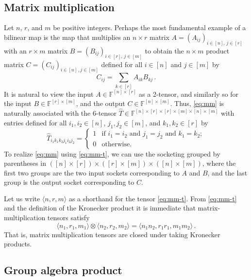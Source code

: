 \documentclass[11pt]{article}
\numberwithin{equation}{section}
\theoremstyle{definition}
\theoremstyle{plain}
\newcommand{\bra}{\ensuremath{\langle}}
\newcommand{\ket}{\ensuremath{\rangle}}
\newcommand{\F}{\ensuremath{\mathbb{F}}}
\begin{document}
\subsection{Matrix multiplication}
\label{sect:mm}

Let $n$, $r$, and $m$ be positive integers.
Perhaps the most fundamental example of a bilinear map is the map
that multiplies
an $n\times r$ matrix $A=(A_{ij})_{i\in[n],\,j\in [r]}$ with
an $r\times m$ matrix $B=(B_{ij})_{i\in[r],\,j\in [m]}$
to obtain the $n\times m$ product matrix $C=(C_{ij})_{i\in [n]\,,j\in [m]}$
defined for all $i\in[n]$ and $j\in [m]$ by
\begin{equation}
\label{eq:mm}
C_{ij}=\sum_{k\in[r]} A_{ik}B_{kj}\,.
\end{equation}
It is natural to view the input $A\in\F^{[n]\times [r]}$ as a 2-tensor,
and similarly so for the input $B\in\F^{[r]\times [m]}$, and the
output $C\in\F^{[n]\times [m]}$. Thus, \eqref{eq:mm} is naturally
associated with the 6-tensor
$\hat{T} \in\F^{[n]\times [r]\times [r]\times [m]\times [n]\times [m]}$ with
entries defined for all $i_1,i_2\in [n]$, $j_1, j_2\in[m]$, and
$k_1,k_2\in[r]$ by
\begin{equation}
\label{eq:mm-t}
\hat{T}_{i_1\!k_1\!k_2j_1\!i_2j_2}=
\begin{cases}
1 & \text{if $i_1=i_2$ and $j_1=j_2$ and $k_1=k_2$};\\
0 & \text{otherwise}.
\end{cases}
\end{equation}
To realize \eqref{eq:mm} using \eqref{eq:mm-t}, we can use the socketing
grouped by parentheses in
$([n]\times [r])\times([r]\times [m])\times([n]\times [m])$, where the first
two groups are the two input sockets corresponding to $A$ and $B$,
and the last group is the output socket corresponding to $C$.

Let us write $\bra n,r,m\ket$ as a shorthand for the tensor \eqref{eq:mm-t}.
From \eqref{eq:mm-t} and the definition of the Kronecker product
it is immediate that matrix-multiplication tensors satisfy
\begin{equation}
\label{eq:mm-kron}
\bra n_1,r_1,m_1\ket
\otimes
\bra n_2,r_2,m_2\ket
=
\bra n_1n_2,r_1r_1,m_1m_2\ket\,.
\end{equation}
That is, matrix multiplication tensors are closed under taking  Kronecker products.


\subsection{Group algebra product}
\end{document}
